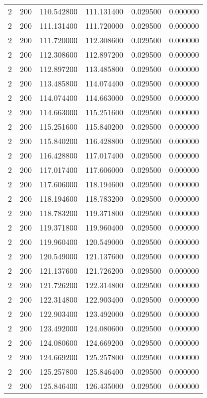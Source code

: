 \begin{longtable}{rrrrrr}
2 & 200 & 110.542800 & 111.131400 & 0.029500 & 0.000000 \\
2 & 200 & 111.131400 & 111.720000 & 0.029500 & 0.000000 \\
2 & 200 & 111.720000 & 112.308600 & 0.029500 & 0.000000 \\
2 & 200 & 112.308600 & 112.897200 & 0.029500 & 0.000000 \\
2 & 200 & 112.897200 & 113.485800 & 0.029500 & 0.000000 \\
2 & 200 & 113.485800 & 114.074400 & 0.029500 & 0.000000 \\
2 & 200 & 114.074400 & 114.663000 & 0.029500 & 0.000000 \\
2 & 200 & 114.663000 & 115.251600 & 0.029500 & 0.000000 \\
2 & 200 & 115.251600 & 115.840200 & 0.029500 & 0.000000 \\
2 & 200 & 115.840200 & 116.428800 & 0.029500 & 0.000000 \\
2 & 200 & 116.428800 & 117.017400 & 0.029500 & 0.000000 \\
2 & 200 & 117.017400 & 117.606000 & 0.029500 & 0.000000 \\
2 & 200 & 117.606000 & 118.194600 & 0.029500 & 0.000000 \\
2 & 200 & 118.194600 & 118.783200 & 0.029500 & 0.000000 \\
2 & 200 & 118.783200 & 119.371800 & 0.029500 & 0.000000 \\
2 & 200 & 119.371800 & 119.960400 & 0.029500 & 0.000000 \\
2 & 200 & 119.960400 & 120.549000 & 0.029500 & 0.000000 \\
2 & 200 & 120.549000 & 121.137600 & 0.029500 & 0.000000 \\
2 & 200 & 121.137600 & 121.726200 & 0.029500 & 0.000000 \\
2 & 200 & 121.726200 & 122.314800 & 0.029500 & 0.000000 \\
2 & 200 & 122.314800 & 122.903400 & 0.029500 & 0.000000 \\
2 & 200 & 122.903400 & 123.492000 & 0.029500 & 0.000000 \\
2 & 200 & 123.492000 & 124.080600 & 0.029500 & 0.000000 \\
2 & 200 & 124.080600 & 124.669200 & 0.029500 & 0.000000 \\
2 & 200 & 124.669200 & 125.257800 & 0.029500 & 0.000000 \\
2 & 200 & 125.257800 & 125.846400 & 0.029500 & 0.000000 \\
2 & 200 & 125.846400 & 126.435000 & 0.029500 & 0.000000 \\

\end{longtable}
